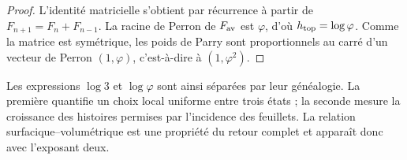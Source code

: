 \begin{proof}
L’identité matricielle s’obtient par récurrence à partir de
\(F_{n+1}=F_n+F_{n-1}\). La racine de Perron de \(F_{\rm av}\) est \(\varphi\),
d’où \(h_{\rm top}=\log\varphi\). Comme la matrice est symétrique, les poids
de Parry \cite{v:Parry1964} sont proportionnels au carré d’un vecteur de Perron
\((1,\varphi)\), c’est-à-dire à \((1,\varphi^2)\).
\end{proof}

Les expressions \(\log3\) et \(\log\varphi\) sont ainsi séparées par leur
généalogie. La première quantifie un choix local uniforme entre trois
états ; la seconde mesure la croissance des histoires permises par
l’incidence des feuillets. La relation surfacique--volumétrique est une propriété du
retour complet et apparaît donc avec l’exposant deux.

